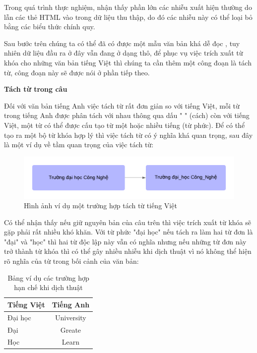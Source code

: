 \documentclass[12pt]{report}
\begin{document}
Trong quá trình thực nghiệm, nhận thấy phần lớn các nhiễu xuất hiện thường do lẫn các thẻ HTML vào trong dữ liệu thu thập, do đó các  nhiễu này có thể loại bỏ bằng các biểu thức chính quy.

Sau bước trên chúng ta có thể đã có được một mẫu văn bản khá dễ đọc , tuy nhiên dữ liệu đầu ra ở đây vẫn đang ở dạng thô, để phục vụ việc trích xuất từ khóa cho những văn bản tiếng Việt thì chúng ta cần thêm một công đoạn là tách từ, công đoạn này sẽ được nói ở phần tiếp theo.

\textbf{Tách từ trong câu}

Đối với văn bản tiếng Anh việc tách từ rất đơn giản so với tiếng Việt, mỗi từ trong tiếng Anh được phân tách với nhau thông qua dấu " " (cách) còn với tiếng Việt, một từ có thể được cấu tạo từ một hoặc nhiều tiếng (từ phức). Để có thể tạo ra một bộ từ khóa hợp lý thì việc tách từ có ý nghĩa khá quan trọng, sau đây là một ví dụ về tầm quan trọng của việc tách từ:


\begin{figure}[h]
	\centering
	\includegraphics[scale=0.9]{word_token}
	\caption{Hình ảnh ví dụ một trường hợp tách từ tiếng Việt}
\end{figure}

Có thể nhận thấy nếu giữ nguyên bản của câu trên thì việc trích xuất từ khóa sẽ gặp phải rất nhiều khó khăn. Với từ phức "đại học" nếu tách ra làm hai từ đơn là "đại" và "học" thì hai từ độc lập này vẫn có nghĩa nhưng nếu những từ đơn này trở thành từ khóa thì có thể gây nhiều nhiễu khi dịch thuật vì nó không thể hiện rõ nghĩa của từ trong bối cảnh của văn bản: 

\begin{table}[h]
	\centering
	\caption{Bảng ví dụ các trường hợp hạn chế khi dịch thuật}
	\begin{tabular}{|l|c|}
		\hline
		\textbf{Tiếng Việt}             & \textbf{Tiếng Anh} \\ \hline
		Đại học                         & University  \\ \hline
		Đại															& Greate			\\ \hline
		Học                             & Learn 			\\ \hline
	\end{tabular}	
\end{table}
\end{document}
